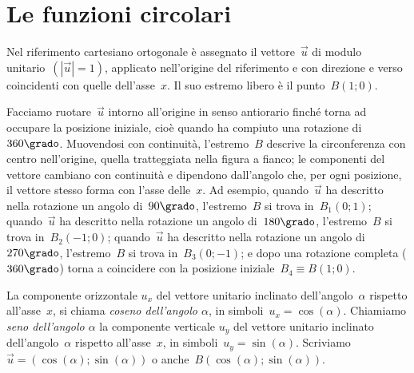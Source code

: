 \vspazio\ovalbox{\risolvii \ref{ese:G.68}, \ref{ese:G.69}, \ref{ese:G.70}, \ref{ese:G.71}, \ref{ese:G.72}, \ref{ese:G.73}, \ref{ese:G.74}}

\section{Le funzioni circolari}

\begin{multicols}{2}
Nel riferimento cartesiano ortogonale è assegnato il vettore~$\vec{u}$ di modulo unitario~$\left(\left|\vec{u}\right|=1\right)$,
applicato nell'origine del riferimento e con direzione e verso coincidenti con quelle dell'asse~$x$. Il suo estremo libero è il punto~$B(1;0)$.

Facciamo ruotare~$\vec{u}$ intorno all'origine in senso antiorario finché torna ad occupare la posizione iniziale,
cioè quando ha compiuto una rotazione di~$360\grado$. Muovendosi con continuità, l'estremo~$B$ descrive la circonferenza con centro
nell'origine, quella tratteggiata nella figura a fianco; le componenti del vettore cambiano con continuità e dipendono dall'angolo che,
per ogni posizione, il vettore stesso forma con l'asse delle~$x$. Ad esempio, quando~$\vec{u}$ ha descritto nella rotazione
un angolo di~$90\grado$, l'estremo~$B$ si trova in~$B_1(0;1)$; quando~$\vec{u}$ ha descritto nella rotazione un angolo di~$180\grado$,
l'estremo~$B$ si trova in~$B_2(-1;0)$; quando~$\vec{u}$ ha descritto nella rotazione un angolo di~$270\grado$, l'estremo~$B$ si trova
in~$B_3(0;-1)$; e dopo una rotazione completa ($360\grado$) torna a coincidere con la posizione iniziale~$B_4{\equiv}B(1;0)$.

\begin{center}
 
\end{center}
\end{multicols}


\begin{definizione}
La componente orizzontale $u_{x}$ del vettore unitario inclinato dell'angolo~$\alpha$ rispetto all'asse~$x$, si chiama \emph{coseno dell'angolo
$\alpha$}, in simboli~$u_{x}=\cos(\alpha)$. Chiamiamo \emph{seno dell'angolo ${\alpha}$} la componente verticale $u_{y}$
del vettore unitario inclinato dell'angolo~${\alpha}$ rispetto all'asse~$x$, in simboli~$u_{y}=\sin(\alpha)$.
Scriviamo~$\vec{u}=(\cos(\alpha);\sin(\alpha))$ o anche~$B(\cos(\alpha);\sin(\alpha))$.
\end{definizione}

